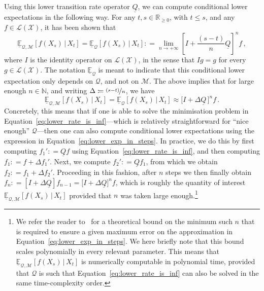 \documentclass[twoside,11pt]{article}
\newcommand{\nats}{\mathbb{N}}
\newcommand{\reals}{\mathbb{R}}
\newcommand{\realsnonneg}{\reals_{\geq 0}}
\newcommand{\states}{\mathcal{X}}
\newcommand{\lexp}{\underline{\mathbb{E}}_{\rateset,\mathcal{M}}}
\newcommand{\gambles}{\mathcal{L}}
\newcommand{\gamblesX}{\gambles(\states)}
\newcommand{\rateset}{\mathcal{Q}}
\newcommand{\lrate}{\underline{Q}}
\newcommand{\coloneqq}{:\!=}
\begin{document}
Using this lower transition rate operator $\lrate$, we can compute conditional lower expectations in the following way. For any $t,s\in\realsnonneg$, with $t\leq s$, and any $f\in\gamblesX$, it has been shown that
\begin{equation*}
\lexp[f(X_s)\,\vert\,X_t] = \underline{\mathbb{E}}_\rateset[f(X_s)\,\vert\,X_t] \coloneqq \lim_{n\to+\infty}\left[I+\frac{(s-t)}{n}\lrate\right]^n f\,,
\end{equation*}
where $I$ is the identity operator on $\gamblesX$, in the sense that $I g=g$ for every $g\in\gamblesX$.
The notation $\underline{\mathbb{E}}_\rateset$ is meant to indicate that this conditional lower expectation only depends on $\rateset$, and not on $\mathcal{M}$. The above implies that for large enough $n\in\nats$, and writing $\Delta\coloneqq \nicefrac{(s-t)}{n}$, we have
\begin{equation}\label{eq:lower_exp_in_steps}
\lexp[f(X_s)\,\vert\,X_t] = \underline{\mathbb{E}}_\rateset[f(X_s)\,\vert\,X_t] \approx \bigl[I + \Delta\lrate\,\bigr]^nf\,.
\end{equation}
Concretely, this means that if one is able to solve the minimisation problem in Equation~\eqref{eq:lower_rate_is_inf}---which is relatively straightforward for ``nice enough'' $\rateset$---then one can also compute conditional lower expectations using the expression in Equation~\ref{eq:lower_exp_in_steps}. In practice, we do this by first computing $f_1'\coloneqq \lrate f$ using Equation~\eqref{eq:lower_rate_is_inf}, and then computing $f_1\coloneqq f + \Delta f_1'$. Next, we compute $f_2'\coloneqq \lrate f_1$, from which we obtain $f_2\coloneqq f_1 + \Delta f_2'$. Proceeding in this fashion, after $n$ steps we then finally obtain $f_n \coloneqq [I+\Delta\lrate]f_{n-1} = \bigl[I+\Delta\lrate\bigr]^nf$, which is roughly the quantity of interest $\underline{\mathbb{E}}_{\rateset,\mathcal{M}}[f(X_s)\,\vert\,X_t]$ provided that $n$ was taken large enough.\footnote{We refer the reader to~\citep[Proposition 8.5]{krak2016ictmc} for a theoretical bound on the minimum such $n$ that is required to ensure a given maximum error on the approximation in Equation~\eqref{eq:lower_exp_in_steps}. We here briefly note that this bound scales polynomially in every relevant parameter. This means that $\lexp[f(X_s)\,\vert\,X_t]$ is numerically computable in polynomial time, provided that $\rateset$ is such that Equation~\eqref{eq:lower_rate_is_inf} can also be solved in the same time-complexity order.}
\end{document}

